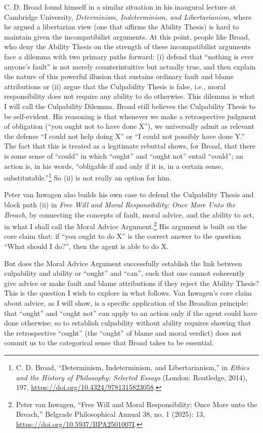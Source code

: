 C. D. Broad found himself in a similar situation in his inaugural
lecture at Cambridge University, \emph{Determinism, Indeterminism, and
Libertarianism}, where he argued a libertarian view (one that affirms
the Ability Thesis) is hard to maintain given the incompatibilist
arguments. At this point, people like Broad, who deny the Ability Thesis
on the strength of these incompatibilist arguments face a dilemma with
two primary paths forward: (i) defend that ``nothing is ever anyone's
fault'' is not merely counterintuitive but actually true, and then
explain the nature of this powerful illusion that sustains ordinary
fault and blame attributions or (ii) argue that the Culpability Thesis
is false, i.e., moral responsibility does not require any ability to do
otherwise. This dilemma is what I will call the Culpability Dilemma.
Broad still believes the Culpability Thesis to be self-evident. His
reasoning is that whenever we make a retrospective judgment of
obligation (``you ought not to have done X''), we universally admit as
relevant the defense ``I could not help doing X'' or ``I could not
possibly have done Y.'' The fact that this is treated as a legitimate
rebuttal shows, for Broad, that there is some sense of ``could'' in
which ``ought'' and ``ought not'' entail ``could''; an action is, in his
words, ``obligable if and only if it is, in a certain sense,
substitutable.''\footnote{C. D. Broad, ``Determinism, Indeterminism, and
  Libertarianism,'' in \emph{Ethics and the History of Philosophy:
  Selected Essays} (London: Routledge, 2014), 197,
  \url{https://doi.org/10.4324/9781315823058}.} So (ii) is not really an
option for him.

Peter van Inwagen also builds his own case to defend the Culpability
Thesis and block path (ii) in \emph{Free Will and Moral Responsibility:
Once More Unto the Breach}, by connecting the concepts of fault, moral
advice, and the ability to act, in what I shall call the Moral Advice
Argument.\footnote{Peter van Inwagen, ``Free Will and Moral
  Responsibility: Once More unto the Breach,'' Belgrade Philosophical
  Annual 38, no. 1 (2025): 13, \url{https://doi.org/10.5937/BPA2501007I}.} His
argument is built on the core claim that: if ``you ought to do X'' is
the correct answer to the question ``What should I do?'', then the agent
is able to do X.

But does the Moral Advice Argument successfully establish the link
between culpability and ability or ``ought'' and ``can'', such that one
cannot coherently give advice or make fault and blame attributions if
they reject the Ability Thesis? This is the question I wish to explore
in what follows. Van Inwagen's core claim about advice, as I will show,
is a specific application of the Broadian principle: that ``ought'' and
``ought not'' can apply to an action only if the agent could have done
otherwise; so to establish culpability without ability requires showing
that the retrospective ``ought'' (the ``ought'' of blame and moral
verdict) does not commit us to the categorical sense that Broad takes to
be essential.


